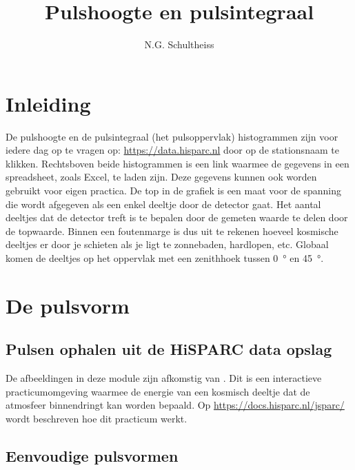 

\title{Pulshoogte en pulsintegraal}
\author{N.G. Schultheiss}



\maketitle

\section{Inleiding}

De pulshoogte en de pulsintegraal (het pulsoppervlak) histogrammen zijn
voor iedere dag op te vragen op: \url{https://data.hisparc.nl} door op de
stationsnaam te klikken. Rechtsboven beide histogrammen is een link
waarmee de gegevens in een spreadsheet, zoals Excel, te laden zijn. Deze
gegevens kunnen ook worden gebruikt voor eigen practica. De top in de
grafiek is een maat voor de spanning die wordt afgegeven als een enkel
deeltje door de detector gaat. Het aantal deeltjes dat de detector treft
is te bepalen door de gemeten waarde te delen door de topwaarde. Binnen
een foutenmarge is dus uit te rekenen hoeveel kosmische deeltjes er door
je schieten als je ligt te zonnebaden, hardlopen, etc. Globaal komen de
deeltjes op het oppervlak met een zenithhoek tussen \SI{0}{\degree} en
\SI{45}{\degree}.


\section{De pulsvorm}


\subsection{Pulsen ophalen uit de HiSPARC data opslag}

De afbeeldingen in deze module zijn afkomstig van \jsparc. Dit is een
interactieve practicumomgeving waarmee de energie van een kosmisch
deeltje dat de atmosfeer binnendringt kan worden bepaald. Op
\url{https://docs.hisparc.nl/jsparc/} wordt beschreven hoe
dit practicum werkt.


\subsection{Eenvoudige pulsvormen}

